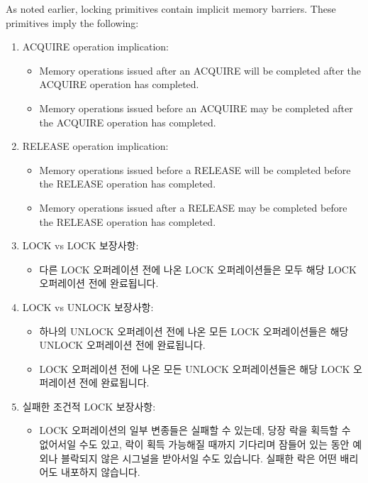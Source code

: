 \begin{enumerate}
\begin{enumerate}
As noted earlier, locking primitives contain implicit memory barriers.
These primitives imply the following:
\begin{enumerate}
\item	ACQUIRE operation implication:
	\begin{itemize}
	\item	Memory operations issued after an ACQUIRE will be completed
		after the ACQUIRE operation has completed.
	\item	Memory operations issued before an ACQUIRE may be completed
		after the ACQUIRE operation has completed.
	\end{itemize}
\item	RELEASE operation implication:
	\begin{itemize}
	\item	Memory operations issued before a RELEASE will be
		completed before the RELEASE operation has completed.
	\item	Memory operations issued after a RELEASE may be completed
		before the RELEASE operation has completed.
	\end{itemize}
\fi
\item	LOCK vs LOCK 보장사항:
	\begin{itemize}
	\item	다른 LOCK 오퍼레이션 전에 나온 LOCK 오퍼레이션들은 모두 해당
		LOCK 오퍼레이션 전에 완료됩니다.
	\end{itemize}
\item	LOCK vs UNLOCK 보장사항:
	\begin{itemize}
	\item	하나의 UNLOCK 오퍼레이션 전에 나온 모든 LOCK 오퍼레이션들은
		해당 UNLOCK 오퍼레이션 전에 완료됩니다.
	\item	LOCK 오퍼레이션 전에 나온 모든 UNLOCK 오퍼레이션들은 해당 LOCK
		오퍼레이션 전에 완료됩니다.
	\end{itemize}
\item	실패한 조건적 LOCK 보장사항:
	\begin{itemize}
	\item	LOCK 오퍼레이션의 일부 변종들은 실패할  수 있는데, 당장 락을
		획득할 수 없어서일 수도 있고, 락이 획득 가능해질 때까지
		기다리며 잠들어 있는 동안 예외나 블락되지 않은 시그널을
		받아서일 수도 있습니다.
		실패한 락은 어떤 배리어도 내포하지 않습니다.
	\end{itemize}
\end{enumerate}
\iffalse


\end{enumerate}
\end{enumerate}
